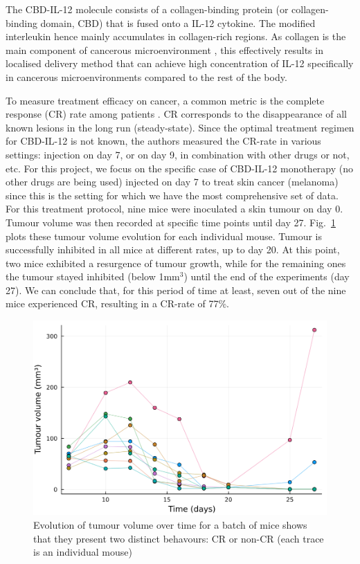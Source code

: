 \documentclass[11pt]{article}
\begin{document}
The CBD-IL-12  molecule consists of a collagen-binding protein (or collagen-binding domain, CBD) that is fused onto a IL-12 cytokine. The modified interleukin hence mainly accumulates in collagen-rich regions. As collagen is the main component of cancerous microenvironment \cite{collagenInCancer}, this effectively results in localised delivery method that can achieve high concentration of IL-12 specifically in cancerous microenvironments compared to the rest of the body.

To measure treatment efficacy on cancer, a common metric is the complete response (CR) rate among patients \cite{cancMetric}. CR corresponds to the disappearance of all known lesions \cite{CRDef} in the long run (steady-state). Since the optimal treatment regimen for CBD-IL-12 is not known, the authors measured the CR-rate in various settings: injection on day 7, or on day 9, in combination with other drugs or not, etc. For this project, we focus on the specific case of CBD-IL-12 monotherapy (no other drugs are being used) injected on day 7 to treat skin cancer (melanoma) since this is the setting for which we have the most comprehensive set of data. For this treatment protocol, nine mice were inoculated a skin tumour on day 0. Tumour volume was then recorded at specific time points until day 27. Fig.~\ref{fig:outcomedual} plots these tumour volume evolution for each individual mouse. Tumour is successfully inhibited in all mice at different rates, up to day 20. At this point, two mice exhibited a resurgence of tumour growth, while for the remaining ones the tumour stayed inhibited (below 1mm$^3$) until the end of the experiments (day 27). We can conclude that, for this period of time at least, seven out of the nine mice experienced CR, resulting in a CR-rate of 77\%. 

\begin{figure}[!ht]
    \centering\includegraphics[scale=0.3]{crnoncr3.png}
    \caption{Evolution of tumour volume over time for a batch of mice shows that they present two distinct behavours: CR or non-CR (each trace is an individual mouse)}
    \label{fig:outcomedual}
\end{figure}
\end{document}
